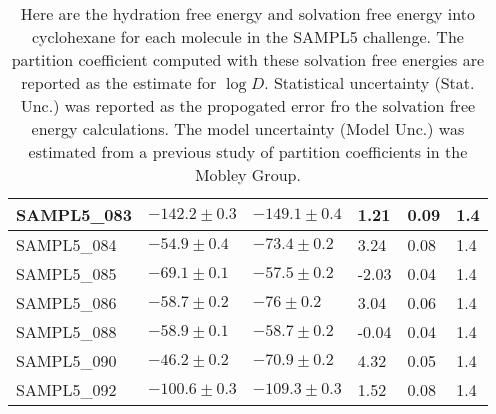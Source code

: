 \documentclass{article}
\begin{document}
\begin{table}[]
\begin{tabular}{|l|l|l|l|l|l|}
SAMPL5\_083 & $ -142.2 \pm 0.3 $              & $ -149.1 \pm 0.4 $                  & 1.21     & 0.09       & 1.4        \\ \hline
SAMPL5\_084 & $ -54.9 \pm 0.4 $               & $ -73.4 \pm 0.2 $                   & 3.24     & 0.08       & 1.4        \\ \hline
SAMPL5\_085 & $ -69.1 \pm 0.1 $               & $ -57.5 \pm 0.2 $                   & -2.03    & 0.04       & 1.4        \\ \hline
SAMPL5\_086 & $ -58.7 \pm 0.2 $               & $ -76 \pm 0.2 $                     & 3.04     & 0.06       & 1.4        \\ \hline
SAMPL5\_088 & $ -58.9 \pm 0.1 $               & $ -58.7 \pm 0.2 $                   & -0.04    & 0.04       & 1.4        \\ \hline
SAMPL5\_090 & $ -46.2 \pm 0.2 $               & $ -70.9 \pm 0.2 $                   & 4.32     & 0.05       & 1.4        \\ \hline
SAMPL5\_092 & $ -100.6 \pm 0.3 $              & $ -109.3 \pm 0.3 $                  & 1.52     & 0.08       & 1.4        \\ \hline
\end{tabular}
\label{submissionData}
\caption{Here are the hydration free energy and solvation free energy into cyclohexane for each molecule in the SAMPL5 challenge. The partition coefficient computed with these solvation free energies are reported as the estimate for $\log D$. Statistical uncertainty (Stat. Unc.) was reported as the propogated error fro the solvation free energy calculations. The model uncertainty (Model Unc.) was estimated from a previous study of partition coefficients in the Mobley Group. }
\end{table}
\end{document}
